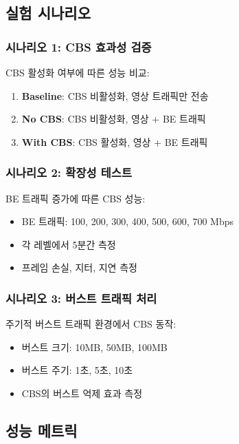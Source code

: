 \documentclass[twocolumn,10pt]{article}
\begin{document}
\subsection{실험 시나리오}

\subsubsection{시나리오 1: CBS 효과성 검증}

CBS 활성화 여부에 따른 성능 비교:

\begin{enumerate}
    \item \textbf{Baseline}: CBS 비활성화, 영상 트래픽만 전송
    \item \textbf{No CBS}: CBS 비활성화, 영상 + BE 트래픽
    \item \textbf{With CBS}: CBS 활성화, 영상 + BE 트래픽
\end{enumerate}

\subsubsection{시나리오 2: 확장성 테스트}

BE 트래픽 증가에 따른 CBS 성능:

\begin{itemize}
    \item BE 트래픽: 100, 200, 300, 400, 500, 600, 700 Mbps
    \item 각 레벨에서 5분간 측정
    \item 프레임 손실, 지터, 지연 측정
\end{itemize}

\subsubsection{시나리오 3: 버스트 트래픽 처리}

주기적 버스트 트래픽 환경에서 CBS 동작:

\begin{itemize}
    \item 버스트 크기: 10MB, 50MB, 100MB
    \item 버스트 주기: 1초, 5초, 10초
    \item CBS의 버스트 억제 효과 측정
\end{itemize}

\subsection{성능 메트릭}
\end{document}
